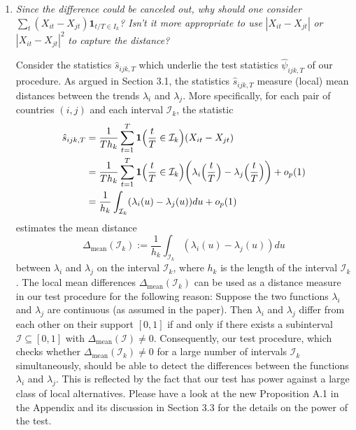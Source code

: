 \documentclass[a4paper,12pt]{article}
\begin{document}
\begin{enumerate}[label=(\arabic*),leftmargin=0.7cm]


\item \textit{Since the difference could be canceled out, why should one consider} $\sum\nolimits_t (X_{it} - X_{jt})\mathbf{1}_{t/T \in I_k}$\textit{? Isn't it more appropriate to use} $|X_{it} - X_{jt}|$ \textit{ or } $|X_{it} - X_{jt}|^2$ \textit{to capture the distance?}

Consider the statistics $\hat{s}_{ijk,T}$ which underlie the test statistics $\hat{\psi}_{ijk,T}$ of our procedure. As argued in Section 3.1, the statistics $\hat{s}_{ijk,T}$ measure (local) mean distances between the trends $\lambda_i$ and $\lambda_j$. More specifically, for each pair of countries $(i,j)$ and each interval $\mathcal{I}_k$, the statistic
\begin{align*} 
\hat{s}_{ijk,T} 
 & = \frac{1}{Th_k} \sum\limits_{t=1}^T \boldsymbol{1}\Big(\frac{t}{T} \in \mathcal{I}_k\Big) (X_{it} - X_{jt}) \\
 & = \frac{1}{Th_k} \sum\limits_{t=1}^T \boldsymbol{1}\Big(\frac{t}{T} \in \mathcal{I}_k\Big) \bigg( \lambda_i \Big(\frac{t}{T}\Big)  - \lambda_j \Big(\frac{t}{T}\Big)\bigg) + o_p(1) \\
 & = \frac{1}{h_k} \int_{\mathcal{I}_k} (\lambda_i(u) - \lambda_j(u)) du + o_p(1) 
\end{align*}
estimates the mean distance 
\[ \Delta_{\text{mean}}(\mathcal{I}_k) := \frac{1}{h_k} \int_{\mathcal{I}_k} (\lambda_i(u) - \lambda_j(u)) du \]
between $\lambda_i$ and $\lambda_j$ on the interval $\mathcal{I}_k$, where $h_k$ is the length of the interval $\mathcal{I}_k$. The local mean differences $\Delta_{\text{mean}}(\mathcal{I}_k)$ can be used as a distance measure in our test procedure for the following reason: Suppose the two functions $\lambda_i$ and $\lambda_j$ are continuous (as assumed in the paper). Then $\lambda_i$ and $\lambda_j$ differ from each other on their support $[0,1]$ if and only if there exists a subinterval $\mathcal{I} \subseteq [0,1]$ with $\Delta_{\text{mean}}(\mathcal{I}) \ne 0$. Consequently, our test procedure, which checks whether $\Delta_{\text{mean}}(\mathcal{I}_k) \ne 0$ for a large number of intervals $\mathcal{I}_k$ simultaneously, should be able to detect the differences between the functions $\lambda_i$ and $\lambda_j$. This is reflected by the fact that our test has power against a large class of local alternatives. Please have a look at the new Proposition A.1 in the Appendix and its discussion in Section 3.3 for the details on the power of the test.


\end{enumerate}
\end{document}
